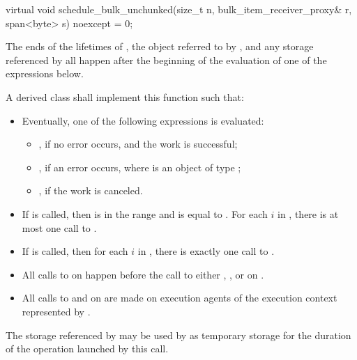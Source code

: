 %
\begin{itemdecl}
virtual void schedule_bulk_unchunked(size_t n, bulk_item_receiver_proxy& r,
                                     span<byte> s) noexcept = 0;
\end{itemdecl}

\begin{itemdescr}
\pnum
\expects
The ends of
the lifetimes of ,
the object referred to by , and
any storage referenced by 
all happen after
the beginning of the evaluation of one of the expressions below.

\pnum
\effects
A derived class shall implement this function such that:
\begin{itemize}
\item
Eventually, one of the following expressions is evaluated:
\begin{itemize}
\item
{}, if no error occurs, and the work is successful;
\item
{}, if an error occurs,
where  is an object of type ;
\item
{}, if the work is canceled.
\end{itemize}
\item
If  is called,
then  is in the range  and
 is equal to .
For each $i$ in ,
there is at most one call to .
\item
If  is called,
then for each $i$ in ,
there is exactly one call to .
\item
All calls to  on  happen before
the call to either , , or 
on .
\item
All calls to  and  on  are made
on execution agents of the execution context represented by .
\end{itemize}

\pnum
\remarks
The storage referenced by  may be used by 
as temporary storage for the duration of the operation launched by this call.
\end{itemdescr}

